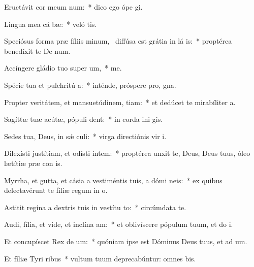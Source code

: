 \item Eructávit cor meum  num:~* dico ego ópe  gi.
\item Lingua mea cá bæ:~* veló tis.
\item Speciósus forma præ fíliis minum,~\pscross{} diffúsa est grátia in lá is:~* proptérea benedíxit te De  num.
\item Accíngere gládio tuo super  um,~* me.
\item Spécie tua et pulchritú a:~* inténde, próspere pro,  gna.
\item Propter veritátem, et mansuetúdinem,  tiam:~* et dedúcet te mirabíliter  a.
\item Sagíttæ tuæ acútæ, pópuli   dent:~* in corda ini gis.
\item Sedes tua, Deus, in sǽ culi:~* virga directiónis vir  i.
\item Dilexísti justítiam, et odísti intem:~* proptérea unxit te, Deus, Deus tuus, óleo lætítiæ præ con is.
\item Myrrha, et gutta, et cásia a vestiméntis tuis, a dómi neis:~* ex quibus delectavérunt te fíliæ regum in  o.
\item Astitit regína a dextris tuis in vestítu to:~* circúmdata te.
\item Audi, fília, et vide, et inclína  am:~* et oblivíscere pópulum tuum, et do  i.
\item Et concupíscet Rex de um:~* quóniam ipse est Dóminus Deus tuus, et ad um.
\item Et fíliæ Tyri  ribus~* vultum tuum deprecabúntur: omnes  bis.
